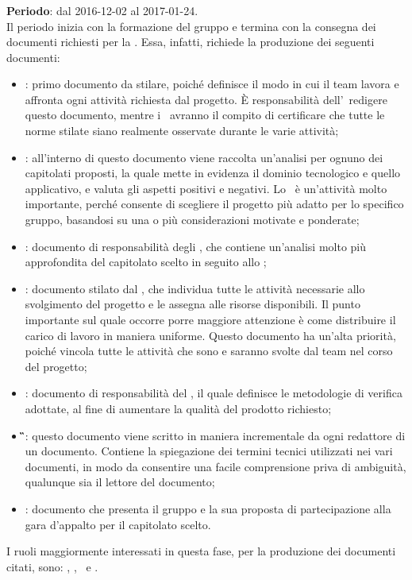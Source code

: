 		\subsubsection{\AR}
		\textbf{Periodo}: dal 2016-12-02 al 2017-01-24.\\
		Il periodo inizia con la formazione del gruppo e termina con la consegna dei documenti richiesti per la \RR. Essa, infatti, richiede la produzione dei seguenti documenti:
		\begin{itemize}
			\item \textbf{\NdP}: primo documento da stilare, poiché definisce il modo in cui il team lavora e affronta ogni attività richiesta dal progetto. \MakeUppercase{è} responsabilità dell’\textit{\Amm}\ redigere questo documento, mentre i \textit{\Vers}\ avranno il compito di certificare che tutte le norme stilate siano realmente osservate durante le varie attività;
			\item \textbf{\SdF}: all'interno di questo documento viene raccolta un'analisi per ognuno dei capitolati proposti, la quale mette in evidenza il dominio tecnologico e quello applicativo, e valuta gli aspetti positivi e negativi. Lo \SdF\ è un’attività molto importante, perché consente di scegliere il progetto più adatto per lo specifico gruppo, basandosi su una o più considerazioni motivate e ponderate;
			\item \textbf{\AdR}: documento di responsabilità degli \textit{\Anas}, che contiene un’analisi molto più approfondita del capitolato scelto in seguito allo \SdF;
			\item \textbf{\PdP}: documento stilato dal \textit{\RdP}, che individua tutte le attività necessarie allo svolgimento del progetto e le assegna alle risorse disponibili. Il punto importante sul quale occorre porre maggiore attenzione è come distribuire il carico di lavoro in maniera uniforme. Questo documento ha un'alta priorità, poiché vincola tutte le attività che sono e saranno svolte dal team nel corso del progetto;
			\item \textbf{\PdQ}: documento di responsabilità del \textit{\Ver}, il quale definisce le metodologie di verifica adottate, al fine di aumentare la qualità del prodotto richiesto;
			\item \textbf{\G}: questo documento viene scritto in maniera incrementale da ogni redattore di un documento. Contiene la spiegazione dei termini tecnici utilizzati nei vari documenti, in modo da consentire una facile comprensione priva di ambiguità, qualunque sia il lettore del documento;
			\item \textbf{\LdP}: documento che presenta il gruppo e la sua proposta di partecipazione alla gara d’appalto per il capitolato scelto.
		\end{itemize}
		I ruoli maggiormente interessati in questa fase, per la produzione dei documenti citati, sono: \textit{\Amm}, \textit{\Res}, \textit{\Ana}\ e \textit{\Ver}.
		
